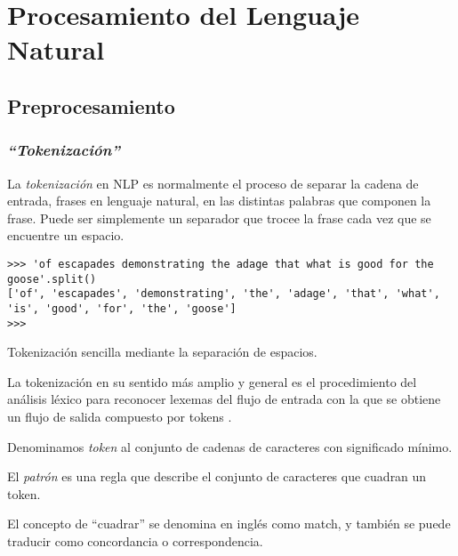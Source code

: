 
\chapter{Procesamiento del Lenguaje Natural}

\section{Preprocesamiento}

\subsection{\emph{``Tokenización''}}

La \emph{tokenización} en NLP es normalmente el proceso de separar la cadena de entrada, frases en lenguaje natural, en las distintas palabras que componen la frase. Puede ser simplemente un separador que trocee la frase cada vez que se encuentre un espacio.
\begin{listing}[H]
\begin{verbatim}
>>> 'of escapades demonstrating the adage that what is good for the goose'.split()
['of', 'escapades', 'demonstrating', 'the', 'adage', 'that', 'what', 'is', 'good', 'for', 'the', 'goose']
>>> 
\end{verbatim}
\caption{Tokenización sencilla mediante la separación de espacios.}
\label{lst:tokenizacion-sencilla}
\end{listing}

La tokenización en su sentido más amplio y general es el procedimiento del análisis léxico para reconocer lexemas del flujo de entrada con la que se obtiene un flujo de salida compuesto por tokens \citep[§2.2]{Jimenez2004}.

\begin{definition}[Token] 
Denominamos \emph{token} al conjunto de cadenas de caracteres con significado mínimo.
\end{definition}

\begin{definition}[Patrón] 
El \emph{patrón} es una regla que describe el conjunto de caracteres que cuadran un token.
\end{definition}

El concepto de ``cuadrar'' se denomina en inglés como match, y también se puede traducir como concordancia o correspondencia.

